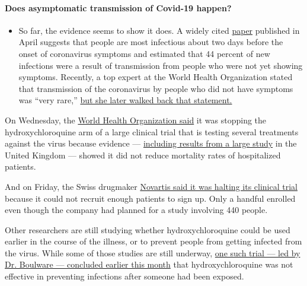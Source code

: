 \begin{itemize}
{  \paragraph{Does asymptomatic transmission of Covid-19
  happen?}\label{does-asymptomatic-transmission-of-covid-19-happen}}

  \begin{itemize}
  \tightlist
  \item
    So far, the evidence seems to show it does. A widely cited
    \href{https://www.nature.com/articles/s41591-020-0869-5}{paper}
    published in April suggests that people are most infectious about
    two days before the onset of coronavirus symptoms and estimated that
    44 percent of new infections were a result of transmission from
    people who were not yet showing symptoms. Recently, a top expert at
    the World Health Organization stated that transmission of the
    coronavirus by people who did not have symptoms was ``very rare,''
    \href{https://www.nytimes.com/2020/06/09/world/coronavirus-updates.html?action=click\&pgtype=Article\&state=default\&region=MAIN_CONTENT_3\&context=storylines_faq\#link-1f302e21}{but
    she later walked back that statement.}
  \end{itemize}
\end{itemize}

On Wednesday, the
\href{https://www.who.int/emergencies/diseases/novel-coronavirus-2019/global-research-on-novel-coronavirus-2019-ncov/solidarity-clinical-trial-for-covid-19-treatments}{World
Health Organization said} it was stopping the hydroxychloroquine arm of
a large clinical trial that is testing several treatments against the
virus because evidence ---
\href{https://www.recoverytrial.net/news/statement-from-the-chief-investigators-of-the-randomised-evaluation-of-covid-19-therapy-recovery-trial-on-hydroxychloroquine-5-june-2020-no-clinical-benefit-from-use-of-hydroxychloroquine-in-hospitalised-patients-with-covid-19}{including
results from a large study} in the United Kingdom --- showed it did not
reduce mortality rates of hospitalized patients.

And on Friday, the Swiss drugmaker
\href{https://www.nytimes.com/reuters/2020/06/19/world/europe/19reuters-health-coronavirus-novartis-hydroxychloroquine.html}{Novartis
said it was halting its clinical trial} because it could not recruit
enough patients to sign up. Only a handful enrolled even though the
company had planned for a study involving 440 people.

Other researchers are still studying whether hydroxychloroquine could be
used earlier in the course of the illness, or to prevent people from
getting infected from the virus. While some of those studies are still
underway,
\href{https://www.nytimes.com/2020/06/03/health/hydroxychloroquine-coronavirus-trump.html}{one
such trial --- led by Dr. Boulware --- concluded earlier this month}
that hydroxychloroquine was not effective in preventing infections after
someone had been exposed.

